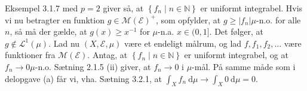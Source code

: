 \documentclass{Class}
\begin{document}
\begin{enumerate}
    
    Eksempel 3.1.7 med $p=2$ giver så, at $\left\{f_n \mid n \in \mathbb{N}\right\}$ er uniformt integrabel. Hvis vi nu betragter en funktion $g \in \mathcal{M}(\mathcal{E})^{+}$, som opfylder, at $g \geq\left|f_n\right| \mu$-n.o. for alle $n$, så må der gælde, at $g(x) \geq x^{-1}$ for $\mu$-n.a. $x \in(0,1]$. Det følger, at $g \notin \mathcal{L}^1(\mu)$.
    Lad nu $(X, \mathcal{E}, \mu)$ være et endeligt målrum, og lad $f, f_1, f_2, \ldots$ være funktioner fra $\mathcal{M}(\mathcal{E})$. Antag, at $\left\{f_n \mid n \in \mathbb{N}\right\}$ er uniformt integrabel, og at $f_n \rightarrow 0 \mu$-n.o. Sætning 2.1.5 (ii) giver, at $f_n \rightarrow 0$ i $\mu$-mål. På samme måde som i delopgave (a) får vi, vha. Sætning 3.2.1, at $\int_X f_n \mathrm{~d} \mu \rightarrow \int_X 0 \mathrm{~d} \mu=0$.
\end{enumerate}
\end{document}
